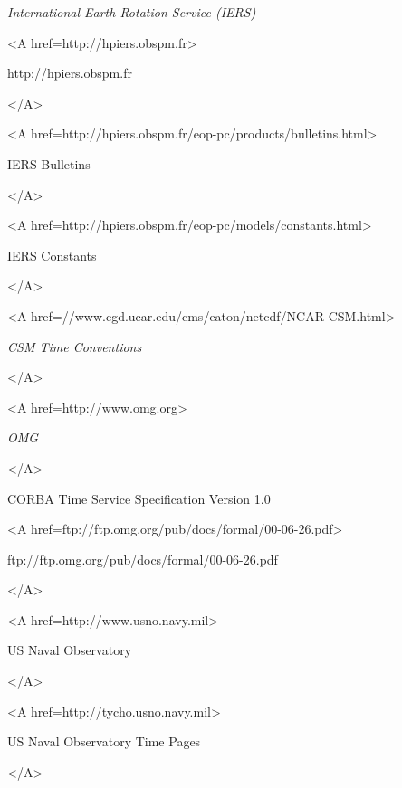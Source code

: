 \def\refname{Reference Material}
\def\bibname{Reference Material}
\begin{thebibliography}{99}

\textsl{International Earth Rotation Service (IERS)}
\begin{rawhtml}<A href=http://hpiers.obspm.fr>\end{rawhtml}
http://hpiers.obspm.fr \\
\begin{rawhtml}</A>\end{rawhtml}
\begin{rawhtml}<A href=http://hpiers.obspm.fr/eop-pc/products/bulletins.html>\end{rawhtml}
IERS Bulletins \\
\begin{rawhtml}</A>\end{rawhtml}
\begin{rawhtml}<A href=http://hpiers.obspm.fr/eop-pc/models/constants.html>\end{rawhtml}
IERS Constants \\
\begin{rawhtml}</A>\end{rawhtml}

\begin{rawhtml}<A href=//www.cgd.ucar.edu/cms/eaton/netcdf/NCAR-CSM.html>\end{rawhtml}
\textsl{CSM Time Conventions} 
\begin{rawhtml}</A>\end{rawhtml}

\begin{rawhtml}<A href=http://www.omg.org>\end{rawhtml}
\textsl{OMG\\} 
\begin{rawhtml}</A>\end{rawhtml}
CORBA Time Service Specification Version 1.0
\begin{rawhtml}<A href=ftp://ftp.omg.org/pub/docs/formal/00-06-26.pdf>\end{rawhtml}
ftp://ftp.omg.org/pub/docs/formal/00-06-26.pdf
\begin{rawhtml}</A>\end{rawhtml}

\begin{rawhtml}<A href=http://www.usno.navy.mil>\end{rawhtml}
US Naval Observatory\\
\begin{rawhtml}</A>\end{rawhtml}
\begin{rawhtml}<A href=http://tycho.usno.navy.mil>\end{rawhtml}
US Naval Observatory Time Pages\\
\begin{rawhtml}</A>\end{rawhtml}


\end{thebibliography}
